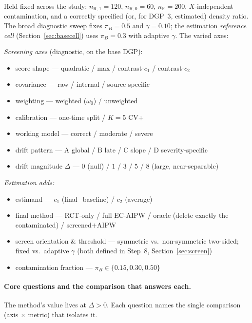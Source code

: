 \documentclass[11pt]{article}
\newcommand{\R}{\mathrm{R}}
\newcommand{\E}{\mathrm{E}}
\begin{document}
Held fixed across the study: $n_{\R,1}=120$, $n_{\R,0}=60$, $n_{\E}=200$, $X$-independent contamination, and a correctly specified (or, for DGP~3, estimated) density ratio. The broad diagnostic sweep fixes $\pi_B=0.5$ and $\gamma=0.10$; the estimation \emph{reference cell} (Section~\ref{sec:basecell}) uses $\pi_B=0.3$ with adaptive $\gamma$. The varied axes:

\emph{Screening axes} (diagnostic, on the base DGP):
\begin{itemize}
    \item score shape --- quadratic / max / contrast-$c_1$ / contrast-$c_2$
    \item covariance --- raw / internal / source-specific
    \item weighting --- weighted ($\omega_0$) / unweighted
    \item calibration --- one-time split / $K{=}5$ CV+
    \item working model --- correct / moderate / severe
    \item drift pattern --- A global / B late / C slope / D severity-specific
    \item drift magnitude $\Delta$ --- $0$ (null) / $1$ / $3$ / $5$ / $8$ (large, near-separable)
\end{itemize}

\emph{Estimation adds:}
\begin{itemize}
    \item estimand --- $c_1$ (final$-$baseline) / $c_2$ (average)
    \item final method --- RCT-only / full EC-AIPW / oracle (delete exactly the contaminated) / screened$+$AIPW
    \item screen orientation \& threshold --- symmetric vs.\ non-symmetric two-sided; fixed vs.\ adaptive $\gamma$ (both defined in Step~8, Section~\ref{sec:screen})
    \item contamination fraction --- $\pi_B\in\{0.15,0.30,0.50\}$
\end{itemize}

\paragraph{Core questions and the comparison that answers each.} The method's value lives at $\Delta>0$. Each question names the single comparison (axis $\times$ metric) that isolates it.
\end{document}
